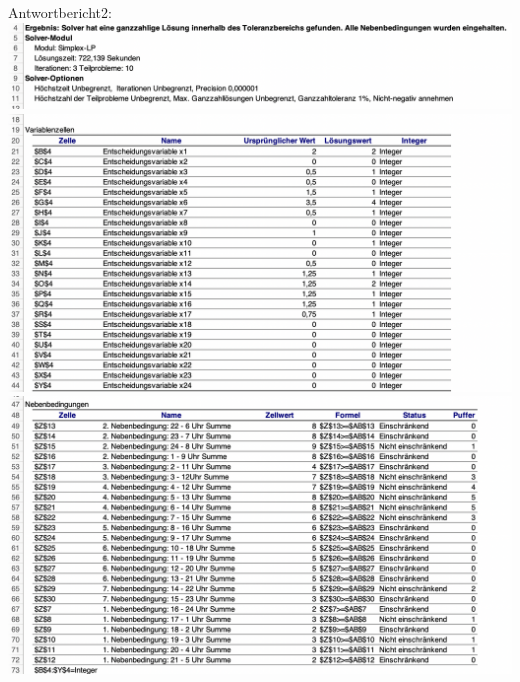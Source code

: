 \\\\\\\\\\\\\\\\\\\\\\\\\\\\\\\\\\\\\\\\\\\\\\\\\\\\\\\\\\
Antwortbericht2:\\
\includegraphics[width=17cm,left]{images/Antwortbericht21.png}
\includegraphics[width=17cm,left]{images/Antwortbericht22.png}
\includegraphics[width=17cm,left]{images/Antwortbericht23.png}



